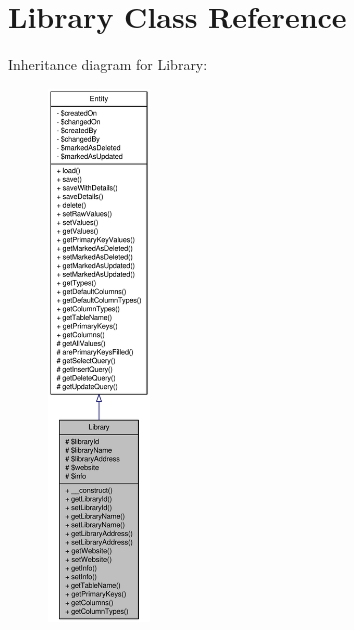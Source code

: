\hypertarget{classLibrary}{
\section{Library Class Reference}
\label{classLibrary}
}


Inheritance diagram for Library:\nopagebreak
\begin{figure}[H]
\begin{center}
\leavevmode
\includegraphics[height=400pt]{classLibrary__inherit__graph}
\end{center}
\end{figure}


